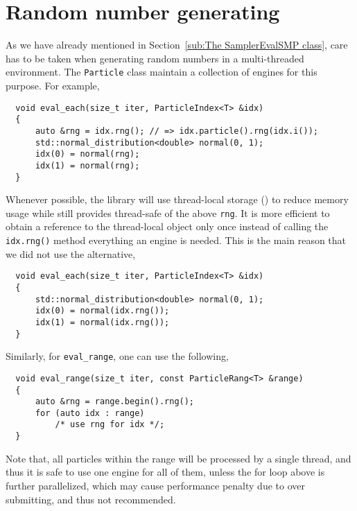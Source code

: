\section{Random number generating}
\label{sec:Random number generating}

As we have already mentioned in Section~\ref{sub:The SamplerEvalSMP class},
care has to be taken when generating random numbers in a multi-threaded
environment. The \verb|Particle| class maintain a collection of \rng engines
for this purpose. For example,
\begin{Verbatim}
  void eval_each(size_t iter, ParticleIndex<T> &idx)
  {
      auto &rng = idx.rng(); // => idx.particle().rng(idx.i());
      std::normal_distribution<double> normal(0, 1);
      idx(0) = normal(rng);
      idx(1) = normal(rng);
  }
\end{Verbatim}
Whenever possible, the library will use thread-local storage (\tls) to reduce
memory usage while still provides thread-safe of the above \verb|rng|. It is
more efficient to obtain a reference to the thread-local object only once
instead of calling the \verb|idx.rng()| method everything an \rng engine is
needed. This is the main reason that we did not use the alternative,
\begin{Verbatim}
  void eval_each(size_t iter, ParticleIndex<T> &idx)
  {
      std::normal_distribution<double> normal(0, 1);
      idx(0) = normal(idx.rng());
      idx(1) = normal(idx.rng());
  }
\end{Verbatim}
Similarly, for \verb|eval_range|, one can use the following,
\begin{Verbatim}
  void eval_range(size_t iter, const ParticleRang<T> &range)
  {
      auto &rng = range.begin().rng();
      for (auto idx : range)
          /* use rng for idx */;
  }
\end{Verbatim}
Note that, all particles within the range will be processed by a single thread,
and thus it is safe to use one \rng engine for all of them, unless the for loop
above is further parallelized, which may cause performance penalty due to over
submitting, and thus not recommended.
